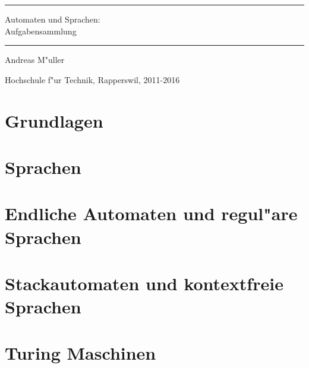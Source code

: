 \documentclass[a4paper,12pt]{book}
\begin{document}
\pagestyle{fancy}
\rhead{}
\frontmatter
\newcommand\HRule{\noindent\rule{\linewidth}{1.5pt}}
\begin{titlepage}
\HRule
\vspace*{2pt}
\begin{flushright}
{\Huge
Automaten und Sprachen:\\
\bigskip
Aufgabensammlung}
\end{flushright}
\HRule
\begin{flushright}
\vspace{30pt}
\LARGE
Andreas M"uller
\end{flushright}
\begin{center}
Hochschule f"ur Technik, Rapperswil, 2011-2016
\end{center}
\end{titlepage}
\hypersetup{
        colorlinks=true,
        linktoc=all,
        linkcolor=blue
}
\tableofcontents
\newenvironment{beispiel}[1][Beispiel]{%
\begin{proof}[#1]%
\renewcommand{\qedsymbol}{$\bigcirc$}
}{\end{proof}}
\mainmatter
\allowdisplaybreaks


\chapter{Grundlagen}

\chapter{Sprachen}

\chapter{Endliche Automaten und regul"are Sprachen}

\chapter{Stackautomaten und kontextfreie Sprachen}

\chapter{Turing Maschinen}

\end{document}
